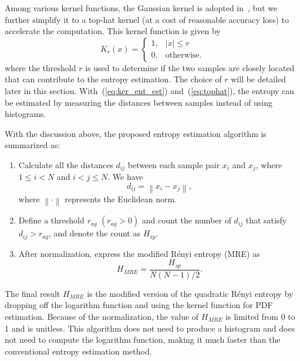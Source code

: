 \documentclass[journal,comsoc, onecolumn, 12pt,draftclsnofoot]{IEEEtran} %
\begin{document}
Among various kernel functions, the Gaussian kernel is adopted in~\cite{Principe2000a}, but we further simplify it to a top-hat kernel (at a cost of reasonable accuracy loss) to accelerate the computation. 
This kernel function is given by
\begin{equation}
{\displaystyle K_{r}(x)={\begin{cases}1,&|x|\leq r\\0,&{\mbox{otherwise.}}\end{cases}}}
\label{eq:tophat}
\end{equation}
where the threshold \(r\) is used to determine if the two samples are closely located that can contribute to the entropy estimation.
The choice of \(r\) will be detailed later in this section.
% 
% 
With~(\ref{eq:ker_ent_est}) and~(\ref{eq:tophat}), the entropy can be estimated by  measuring the distances between samples instead of using histograms.


With the discussion above, the proposed entropy estimation algorithm is summarized as:
\begin{enumerate}
\item Calculate all the distances \(d_{ij}\) between each sample pair \(x_i\) and \(x_j\), where \(1\le i<N\) and \( i<j \le N\). We have
 \begin{equation}
d_{ij}=\left\|x_i-x_j \right\|,
\label{eq:distance}
\end{equation}
where \(\left\| \cdot \right\|\) represents the Euclidean norm.
\item Define a threshold \(r_{ag}\) \((r_{ag}>0)\) and count the number of \(d_{ij}\) that satisfy $d_{ij}>r_{ag}$, and denote the count as $H_{sp}$.
\item After normalization, express the modified R\'enyi entropy (MRE) as
\begin{equation}
H_{MRE}= \frac{ H_{sp}}{ N(N-1)/2}.
\label{eq:entorpy_ad}
\end{equation}
\end{enumerate}



The final result \(H_{MRE}\) is the modified version of the quadratic R\'enyi entropy  by dropping off the logarithm function and using the kernel function for PDF estimation.
Because of the normalization, the value of $H_{MRE}$ is limited from 0 to 1 and is unitless.
This algorithm does not need to produce a histogram and does not need to compute the logarithm function, making it much faster than the conventional entropy estimation method.
\end{document}
